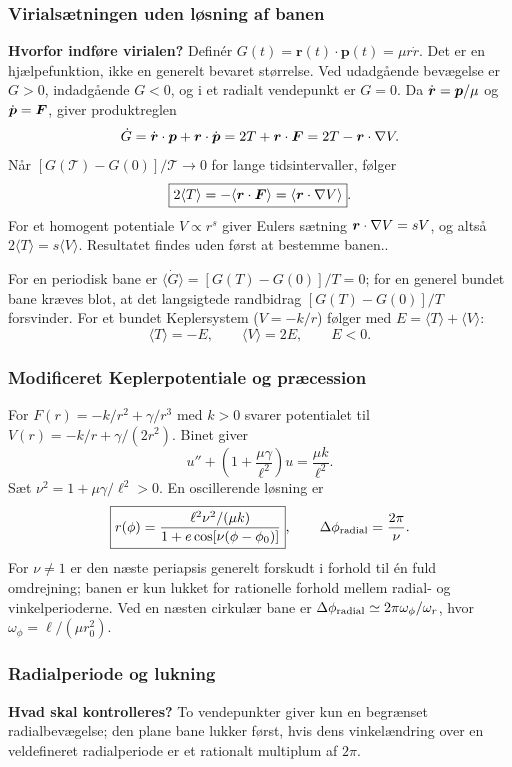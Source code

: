 \subsubsection*{Virialsætningen uden løsning af banen}
\textbf{Hvorfor indføre virialen?} Definér $G(t)=\mathbf r(t)\cdot\mathbf p(t)=\mu r\dot r$. Det er en hjælpefunktion, ikke en generelt bevaret størrelse. Ved udadgående bevægelse er $G>0$, indadgående $G<0$, og i et radialt vendepunkt er $G=0$.
Da $\dot{\boldsymbol{r}}=\boldsymbol{p}/\mu$ og $\dot{\boldsymbol{p}}=\boldsymbol{F}$, giver produktreglen
\[\dot G=\dot{\boldsymbol{r}}\cdot\boldsymbol{p}+\boldsymbol{r}\cdot\dot{\boldsymbol{p}}
=2T+\boldsymbol{r}\cdot\boldsymbol{F}=2T-\boldsymbol{r}\cdot\nabla V.\]
Når $[G(\mathcal T)-G(0)]/\mathcal T\to0$ for lange tidsintervaller, følger
\[\boxed{2\langle T\rangle=-\langle\boldsymbol{r}\cdot\boldsymbol{F}\rangle=\langle\boldsymbol{r}\cdot\nabla V\rangle}.\]
For et homogent potentiale $V\propto r^s$ giver Eulers sætning $\boldsymbol{r}\cdot\nabla V=sV$, og altså $\boxed{2\langle T\rangle=s\langle V\rangle}$. Resultatet findes uden først at bestemme banen..

For en periodisk bane er $\langle\dot G\rangle=[G(T)-G(0)]/T=0$; for en generel bundet bane kræves blot, at det langsigtede randbidrag $[G(T)-G(0)]/T$ forsvinder. For et bundet Keplersystem ($V=-k/r$) følger med $E=\langle T\rangle+\langle V\rangle$:
\[\boxed{\langle T\rangle=-E,\qquad\langle V\rangle=2E},\qquad E<0.\]

\subsubsection*{Modificeret Keplerpotentiale og præcession}
For $F(r)=-k/r^2+\gamma/r^3$ med $k>0$ svarer potentialet til $V(r)=-k/r+\gamma/(2r^2)$. Binet giver
\[u''+\left(1+\frac{\mu\gamma}{\ell^2}\right)u=\frac{\mu k}{\ell^2}.\]
Sæt $\nu^2=1+\mu\gamma/\ell^2>0$. En oscillerende løsning er
\[\boxed{r(\phi)=\frac{\ell^2\nu^2/(\mu k)}{1+e\cos[\nu(\phi-\phi_0)]}},\qquad
\Delta\phi_{\rm radial}=\frac{2\pi}{\nu}.\]
For $\nu\ne1$ er den næste periapsis generelt forskudt i forhold til én fuld omdrejning; banen er kun lukket for rationelle forhold mellem radial- og vinkelperioderne. Ved en næsten cirkulær bane er $\Delta\phi_{\rm radial}\simeq2\pi\omega_\phi/\omega_r$, hvor $\omega_\phi=\ell/(\mu r_0^2)$.

\subsubsection*{Radialperiode og lukning}
\textbf{Hvad skal kontrolleres?} To vendepunkter giver kun en begrænset radialbevægelse; den plane bane lukker først, hvis dens vinkelændring over en veldefineret radialperiode er et rationalt multiplum af $2\pi$.

